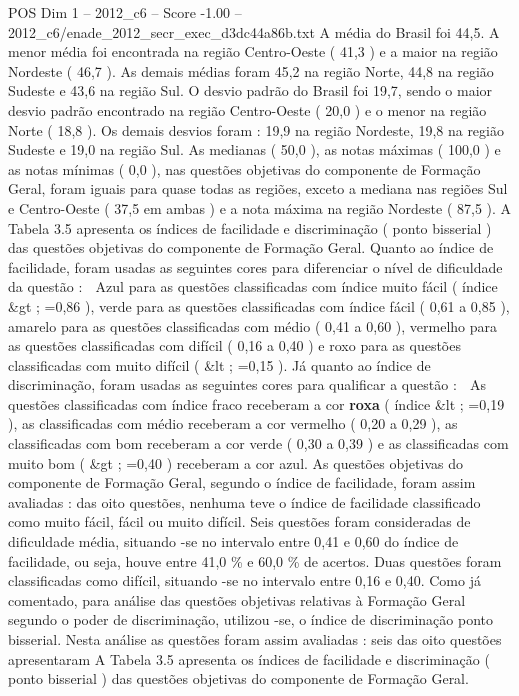 \begin{textsample}{POS Dim 1 – 2012\_c6 – Score -1.00 – 2012\_c6/enade\_2012\_secr\_exec\_d3dc44a86b.txt}
A média do Brasil foi 44,5.
A menor média foi encontrada na região Centro-Oeste ( 41,3 ) e a maior na região Nordeste ( 46,7 ).
As demais médias foram 45,2 na região Norte, 44,8 na região Sudeste e 43,6 na região Sul.
O desvio padrão do Brasil foi 19,7, sendo o maior desvio padrão encontrado na região Centro-Oeste ( 20,0 ) e o menor na região Norte ( 18,8 ).
Os demais desvios foram : 19,9 na região Nordeste, 19,8 na região Sudeste e 19,0 na região Sul.
As medianas ( 50,0 ), as notas máximas ( 100,0 ) e as notas mínimas ( 0,0 ), nas questões objetivas do componente de Formação Geral, foram iguais para quase todas as regiões, exceto a mediana nas regiões Sul e Centro-Oeste ( 37,5 em ambas ) e a nota máxima na região Nordeste ( 87,5 ).
A Tabela 3.5 apresenta os índices de facilidade e discriminação ( ponto bisserial ) das questões objetivas do componente de Formação Geral.
Quanto ao índice de facilidade, foram usadas as seguintes cores para diferenciar o nível de dificuldade da questão :  Azul para as questões classificadas com índice muito fácil ( índice \&gt ; =0,86 ), verde para as questões classificadas com índice fácil ( 0,61 a 0,85 ), amarelo para as questões classificadas com médio ( 0,41 a 0,60 ), vermelho para as questões classificadas com difícil ( 0,16 a 0,40 ) e roxo para as questões classificadas com muito difícil ( \&lt ; =0,15 ).
Já quanto ao índice de discriminação, foram usadas as seguintes cores para qualificar a questão :  As questões classificadas com índice fraco receberam a cor \textbf{roxa} ( índice \&lt ; =0,19 ), as classificadas com médio receberam a cor vermelho ( 0,20 a 0,29 ), as classificadas com bom receberam a cor verde ( 0,30 a 0,39 ) e as classificadas com muito bom ( \&gt ; =0,40 ) receberam a cor azul.
As questões objetivas do componente de Formação Geral, segundo o índice de facilidade, foram assim avaliadas : das oito questões, nenhuma teve o índice de facilidade classificado como muito fácil, fácil ou muito difícil.
Seis questões foram consideradas de dificuldade média, situando -se no intervalo entre 0,41 e 0,60 do índice de facilidade, ou seja, houve entre 41,0 \% e 60,0 \% de acertos.
Duas questões foram classificadas como difícil, situando -se no intervalo entre 0,16 e 0,40.
Como já comentado, para análise das questões objetivas relativas à Formação Geral segundo o poder de discriminação, utilizou -se, o índice de discriminação ponto bisserial.
Nesta análise as questões foram assim avaliadas : seis das oito questões apresentaram A Tabela 3.5 apresenta os índices de facilidade e discriminação ( ponto bisserial ) das questões objetivas do componente de Formação Geral.

\end{textsample}
